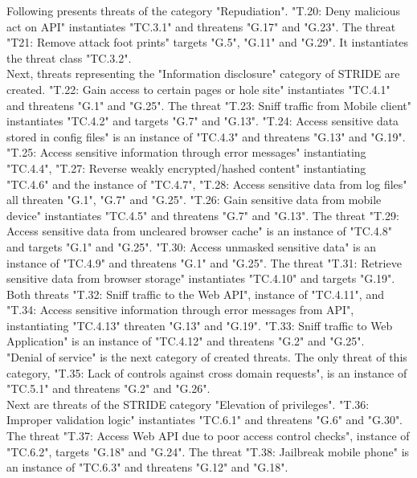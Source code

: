 \newline
Following presents threats of the category "Repudiation". "T.20: Deny malicious act on API" instantiates "TC.3.1" and threatens "G.17" and "G.23". The threat "T21: Remove attack foot prints" targets "G.5", "G.11" and "G.29". It instantiates the threat class "TC.3.2".\\
\newline
Next, threats representing the "Information disclosure" category of STRIDE are created. "T.22: Gain access to certain pages or hole site" instantiates "TC.4.1" and threatens "G.1" and "G.25". The threat "T.23: Sniff traffic from Mobile client" instantiates "TC.4.2" and targets "G.7" and "G.13". "T.24: Access sensitive data stored in config files" is an instance of "TC.4.3" and threatens "G.13" and "G.19". "T.25: Access sensitive information through error messages" instantiating "TC.4.4", "T.27: Reverse weakly encrypted/hashed content" instantiating "TC.4.6" and the instance of "TC.4.7", "T.28: Access sensitive data from log files" all threaten "G.1", "G.7" and "G.25". "T.26: Gain sensitive data from mobile device" instantiates "TC.4.5" and threatens "G.7" and "G.13". The threat "T.29: Access sensitive data from uncleared browser cache" is an instance of "TC.4.8" and targets "G.1" and "G.25". "T.30: Access unmasked sensitive data" is an instance of "TC.4.9" and threatens "G.1" and "G.25". The threat "T.31: Retrieve sensitive data from browser storage" instantiates "TC.4.10" and targets "G.19". Both threats "T.32: Sniff traffic to the Web API", instance of "TC.4.11", and "T.34: Access sensitive information through error messages from API", instantiating "TC.4.13" threaten "G.13" and "G.19". "T.33: Sniff traffic to Web Application" is an instance of "TC.4.12" and threatens "G.2" and "G.25".\\
\newline
"Denial of service" is the next category of created threats. The only threat of this category, "T.35: Lack of controls against cross domain requests", is an instance of "TC.5.1" and threatens "G.2" and "G.26".\\
\newline
Next are threats of the STRIDE category "Elevation of privileges". "T.36: Improper validation logic" instantiates "TC.6.1" and threatens "G.6" and "G.30". The threat "T.37: Access Web API due to poor access control checks", instance of "TC.6.2", targets "G.18" and "G.24". The threat "T.38: Jailbreak mobile phone" is an instance of "TC.6.3" and threatens "G.12" and "G.18".\\
\newline

